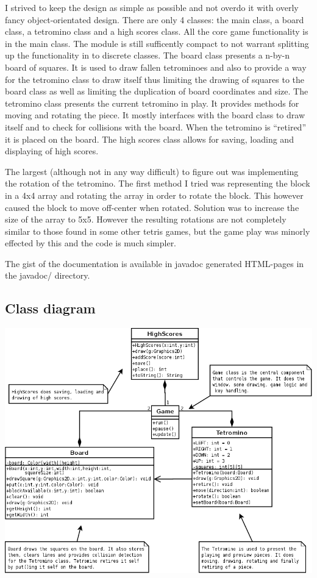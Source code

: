 \documentclass[11pt,a4paper]{article}
\begin{document}
I strived to keep the design as simple as possible and not overdo it with
overly fancy object-orientated design. There are only 4 classes: the main class,
a board class, a tetromino class and a high scores class.
All the core game functionality is in the main class. The module is still sufficently compact to not
 warrant splitting up the functionality in to discrete classes.
The board class presents a n-by-n board of squares. It is used to draw fallen
tetrominoes and also to provide a way for the tetromino class to draw itself
thus limiting the drawing of squares to the board class as well as limiting the
duplication of board coordinates and size.
The tetromino class presents the current tetromino in play. It provides methods
for moving and rotating the piece. It mostly interfaces with the board class
to draw itself and to check for collisions with the board. When the tetromino is
``retired'' it is placed on the board.
The high scores class allows for saving, loading and displaying of high scores.

The largest (although not in any way difficult) to figure out was implementing
the rotation of the tetromino. The first method I tried was representing the block
in a 4x4 array and rotating the array in order to rotate the block. This however caused
the block to move off-center when rotated. Solution was to increase the size
of the array to 5x5. However the resulting rotations are not completely similar
to those found in some other tetris games, but the game play was minorly effected by this
and the code is much simpler.

The gist of the documentation is available in javadoc generated HTML-pages in the
javadoc/ directory.

\subsection {Class diagram}

\vspace{3mm}
\begin{center}
  \includegraphics[scale=0.3]{class_diagram.png}
\end{center}
\end{document}
